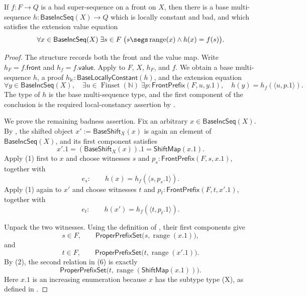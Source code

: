 \begin{lemma}
If $f:F\to Q$ is a bad super-sequence on a front on $X$, then there is a
base multi-sequence $h:\mathsf{BaseIncSeq}(X)\to Q$ which is locally constant
and bad, and which satisfies the extension value equation
\[
\forall x\in\mathsf{BaseIncSeq}(X)\;\exists s\in F\;\bigl(
  s\segs\operatorname{range}(x)\mathbin{\wedge}h(x)=f(s)\bigr).
\]
\end{lemma}
\begin{proof}
The structure  records both the front and the value
map.  Write $h_F=f.\mathsf{front}$ and $h_f=f.\mathsf{value}$.  Apply
 to $F$, $X$, $h_F$, and $f$.  We obtain a
base multi-sequence $h$, a proof
$h_{\mathrm{lc}}:\mathsf{BaseLocallyConstant}(h)$, and the extension
equation
\[
 \forall y\in\mathsf{BaseIncSeq}(X),\quad
 \exists u\in\operatorname{Finset}(\mathbb N)\;\exists p:
 \mathsf{FrontPrefix}(F,u,y.1),\quad
 h(y)=h_f\!\left(\langle u,p.1\rangle\right).              \tag{1}
\]
The type of $h$ is the base multi-sequence type, and the first component of
the conclusion is the required local-constancy assertion by
.

We prove the remaining badness assertion.  Fix an arbitrary
$x\in\mathsf{BaseIncSeq}(X)$.  By , the shifted object
$x':=\mathsf{BaseShift}_X(x)$ is again an element of
$\mathsf{BaseIncSeq}(X)$, and its first component satisfies
\[
 x'.1=(\mathsf{BaseShift}_X(x)).1=\mathsf{ShiftMap}(x.1).       \tag{2}
\]
Apply (1) first to $x$ and choose witnesses $s$ and
$p_s:\mathsf{FrontPrefix}(F,s,x.1)$, together with
\[
 e_s:\qquad h(x)=h_f\!\left(\langle s,p_s.1\rangle\right).    \tag{3}
\]
Apply (1) again to $x'$ and choose witnesses $t$ and
$p_t:\mathsf{FrontPrefix}(F,t,x'.1)$, together with
\[
 e_t:\qquad h(x')=h_f\!\left(\langle t,p_t.1\rangle\right).  \tag{4}
\]

Unpack the two  witnesses.  Using the definition of
, their first components give
\[
 s\in F,\qquad
 \mathsf{ProperPrefixSet}\bigl(s,\operatorname{range}(x.1)\bigr), \tag{5}
\]
and
\[
 t\in F,\qquad
 \mathsf{ProperPrefixSet}\bigl(t,\operatorname{range}(x'.1)\bigr).
                                                                    \tag{6}
\]
By (2), the second relation in (6) is exactly
\[
 \mathsf{ProperPrefixSet}\bigl(t,\operatorname{range}(\mathsf{ShiftMap}(x.1))\bigr).
                                                                    \tag{7}
\]
Here $x.1$ is an increasing enumeration because $x$ has the subtype type
(X), as defined in .


\end{proof}
